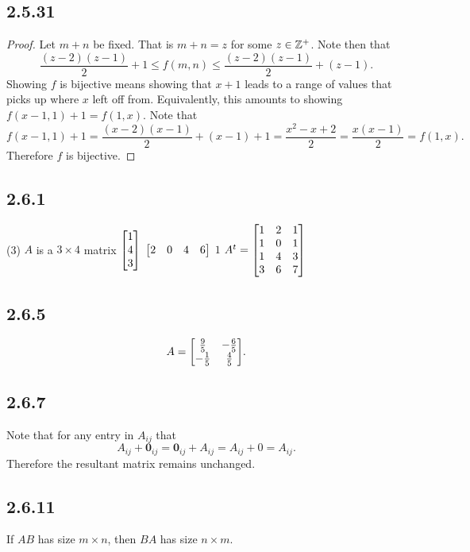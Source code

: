 \documentclass[12pt,titlepage]{extarticle}
\begin{document}
\subsection*{2.5.31}
\begin{proof}
    Let $m + n$ be fixed. That is $m + n = z$ for some $z \in \mathbb{Z}^+$. Note then that
    \[
        \frac{(z-2)(z-1)}{2} + 1 \leq f(m,n) \leq \frac{(z-2)(z-1)}{2} + (z-1)
    .\]
    Showing $f$ is bijective means showing that $x+1$ leads to a range of values that picks up where $x$ left off from. Equivalently, this amounts to showing $f(x-1, 1) + 1 = f(1,x)$. Note that
    \[
        f(x-1, 1) + 1 = \frac{(x-2)(x-1)}{2} + (x-1) + 1 = \frac{x^2 - x + 2}{2} = \frac{x(x-1)}{2} = f(1, x)
    .\]
    Therefore $f$ is bijective.
\end{proof}

\subsection*{2.6.1}
\begin{tasks}(3)
    \task $A$ is a $3\times 4$ matrix
    \task $\mqty[1 \\ 4 \\ 3]$
    \task $\mqty[2 & 0 & 4 & 6]$
    \task $1$
    \task $A^t = \mqty[
    1 & 2 & 1 \\
    1 & 0 & 1 \\
    1 & 4 & 3 \\
    3 & 6 & 7 \\
    ]$
\end{tasks}

\subsection*{2.6.5}
\[
    A = \mqty[
    \frac{9}{5} & -\frac{6}{5} \\
    -\frac{1}{5} & \frac{4}{5}
    ]
.\]

\subsection*{2.6.7}
Note that for any entry in $A_{ij}$ that
\[
    A_{ij} + \mathbf{0}_{ij} = \mathbf{0}_{ij} + A_{ij} = A_{ij} + 0 = A_{ij}
.\]
Therefore the resultant matrix remains unchanged.

\subsection*{2.6.11}
If $AB$ has size $m \times n$, then $BA$ has size $n \times m$.
\end{document}
